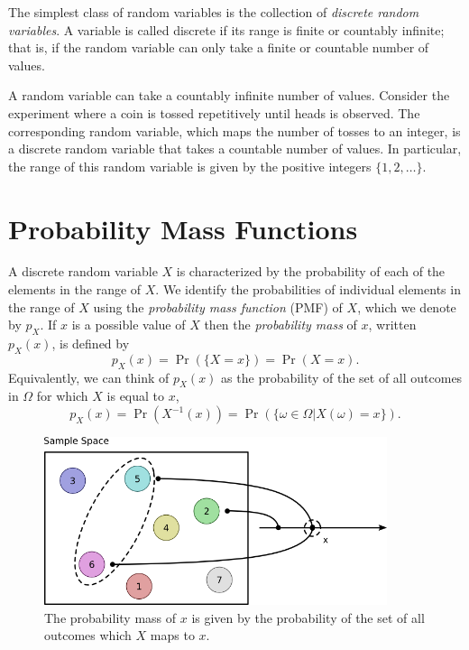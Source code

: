 The simplest class of random variables is the collection of \emph{discrete random variables}.
A variable is called discrete if its range is finite or countably infinite; that is, if the random variable can only take a finite or countable number of values.

\begin{example}
A random variable can take a countably infinite number of values.
Consider the experiment where a coin is tossed repetitively until heads is observed.
The corresponding random variable, which maps the number of tosses to an integer, is a discrete random variable that takes a countable number of values.
In particular, the range of this random variable is given by the positive integers $\{1, 2, \ldots \}$.
\end{example}

\section{Probability Mass Functions}

A discrete random variable $X$ is characterized by the probability of each of the elements in the range of $X$.
We identify the probabilities of individual elements in the range of $X$ using the \emph{probability mass function} (PMF) of $X$, which we denote by $p_X$.
If $x$ is a possible value of $X$ then the \emph{probability mass} of $x$, written $p_X (x)$, is defined by
\begin{equation} \label{equation:PMF}
p_X (x) = \Pr ( \{ X = x \} ) = \Pr ( X = x ) .
\end{equation}
Equivalently, we can think of $p_X (x)$ as the probability of the set of all outcomes in $\Omega$ for which $X$ is equal to $x$,
\begin{equation*}
p_X (x)
= \Pr (  X^{-1} (x)  )
= \Pr ( \{ \omega \in \Omega | X(\omega) = x \} ) .
\end{equation*}

\begin{figure}[ht]
\begin{center}
\includegraphics[height=4.92cm]{Figures/5Chapter/pmf}
\caption{The probability mass of $x$ is given by the probability of the set of all outcomes which $X$ maps to $x$.}
\end{center}
\end{figure}


